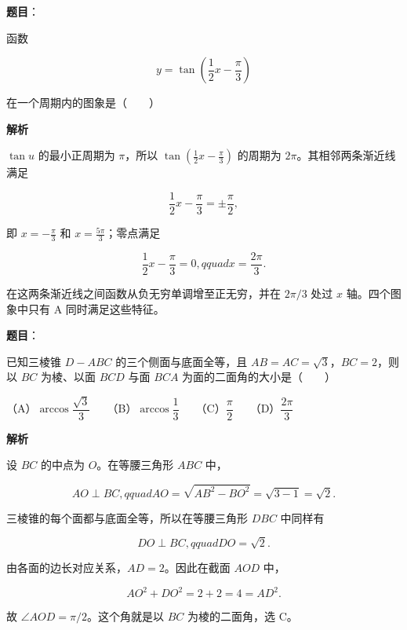 \begin{answer}

\textbf{题目}：

函数

\nopagebreak[4]
\[
y=\tan\left(\dfrac12x-\dfrac\pi3\right)
\]

在一个周期内的图象是\mbox{（　　）}
\nopagebreak[4]
\begin{center}\end{center}
\nopagebreak[4]
\textbf{解析}

$\tan u$ 的最小正周期为 $\pi$，所以 $\tan(\frac12x-\frac\pi3)$ 的周期为 $2\pi$。其相邻两条渐近线满足

\nopagebreak[4]
\[
\frac12x-\frac\pi3=\pm\frac\pi2,
\]

即 $x=-\frac\pi3$ 和 $x=\frac{5\pi}3$；零点满足

\nopagebreak[4]
\[
\frac12x-\frac\pi3=0,qquad x=\frac{2\pi}3.
\]

在这两条渐近线之间函数从负无穷单调增至正无穷，并在 $2\pi/3$ 处过 $x$ 轴。四个图象中只有 A 同时满足这些特征。


\end{answer}
\begin{answer}

\textbf{题目}：

已知三棱锥 $D-ABC$ 的三个侧面与底面全等，且 $AB=AC=\sqrt3$，$BC=2$，则以 $BC$ 为棱、以面 $BCD$ 与面 $BCA$ 为面的二面角的大小是\mbox{（　　）}

（A）$\arccos\dfrac{\sqrt3}{3}$　　（B）$\arccos\dfrac13$　　（C）$\dfrac\pi2$　　（D）$\dfrac{2\pi}3$

\textbf{解析}

设 $BC$ 的中点为 $O$。在等腰三角形 $ABC$ 中，

\nopagebreak[4]
\[
AO\perp BC,qquad AO=\sqrt{AB^2-BO^2}=\sqrt{3-1}=\sqrt2.
\]

三棱锥的每个面都与底面全等，所以在等腰三角形 $DBC$ 中同样有

\nopagebreak[4]
\[
DO\perp BC,qquad DO=\sqrt2.
\]

由各面的边长对应关系，$AD=2$。因此在截面 $AOD$ 中，

\nopagebreak[4]
\[
AO^2+DO^2=2+2=4=AD^2.
\]

故 $\angle AOD=\pi/2$。这个角就是以 $BC$ 为棱的二面角，选 C。


\end{answer}
